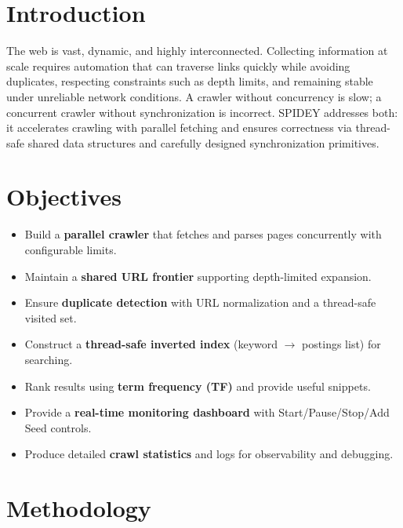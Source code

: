\documentclass[11pt,a4paper]{article}
\begin{document}
\section{Introduction}
The web is vast, dynamic, and highly interconnected. Collecting information at scale requires automation that can traverse links quickly while avoiding duplicates, respecting constraints such as depth limits, and remaining stable under unreliable network conditions. A crawler without concurrency is slow; a concurrent crawler without synchronization is incorrect. SPIDEY addresses both: it accelerates crawling with parallel fetching and ensures correctness via thread-safe shared data structures and carefully designed synchronization primitives.

\section{Objectives}
\begin{itemize}
  \item Build a \textbf{parallel crawler} that fetches and parses pages concurrently with configurable limits.
  \item Maintain a \textbf{shared URL frontier} supporting depth-limited expansion.
  \item Ensure \textbf{duplicate detection} with URL normalization and a thread-safe visited set.
  \item Construct a \textbf{thread-safe inverted index} (keyword $\rightarrow$ postings list) for searching.
  \item Rank results using \textbf{term frequency (TF)} and provide useful snippets.
  \item Provide a \textbf{real-time monitoring dashboard} with Start/Pause/Stop/Add Seed controls.
  \item Produce detailed \textbf{crawl statistics} and logs for observability and debugging.
\end{itemize}

\section{Methodology}
\end{document}

